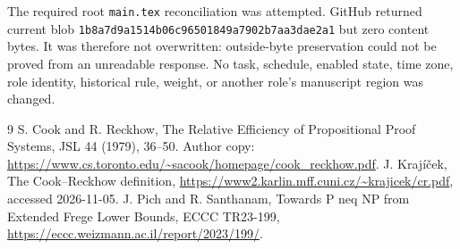 \documentclass[11pt]{article}
\begin{document}
The required root \texttt{main.tex} reconciliation was attempted.  GitHub
returned current blob \texttt{1b8a7d9a1514b06c96501849a7902b7aa3dae2a1} but
zero content bytes.  It was therefore not overwritten: outside-byte
preservation could not be proved from an unreadable response.  No task,
schedule, enabled state, time zone, role identity, historical rule, weight, or
another role's manuscript region was changed.

\begin{thebibliography}{9}
 S. Cook and R. Reckhow, The Relative Efficiency of Propositional
Proof Systems, JSL 44 (1979), 36--50.  Author copy:
\url{https://www.cs.toronto.edu/~sacook/homepage/cook_reckhow.pdf}.
 J. Kraj\'i\v cek, The Cook--Reckhow definition,
\url{https://www2.karlin.mff.cuni.cz/~krajicek/cr.pdf}, accessed 2026-11-05.
 J. Pich and R. Santhanam, Towards P neq NP from Extended Frege
Lower Bounds, ECCC TR23-199, \url{https://eccc.weizmann.ac.il/report/2023/199/}.
\end{thebibliography}
\end{document}
